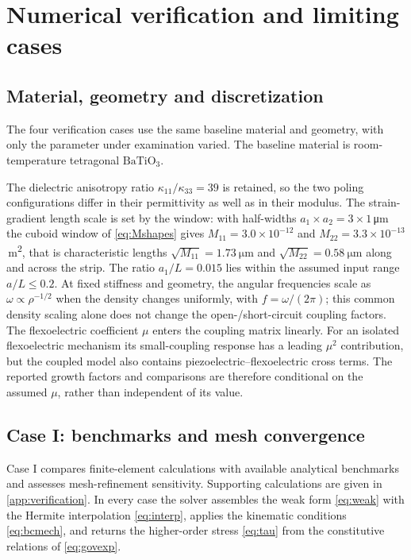 \FloatBarrier
\section{Numerical verification and limiting cases}
\label{sec:verification}

\FloatBarrier
\subsection{Material, geometry and discretization}
\label{sec:material}

The four verification cases use the same baseline material and geometry,
with only the parameter under examination varied. The baseline material is
room-temperature tetragonal $\mathrm{BaTiO_3}$.

The dielectric anisotropy ratio
$\kappa_{11}/\kappa_{33}=39$ is retained, so the two poling configurations
differ in their permittivity as well as in their modulus. The strain-gradient
length scale is set by the window: with half-widths
$a_1\times a_2=3\times1$\,\si{\micro\meter} the cuboid window of
\eqref{eq:Mshapes} gives $M_{11}=3.0\times10^{-12}$ and
$M_{22}=3.3\times10^{-13}$\,\si{\square\meter}, that is characteristic lengths
$\sqrt{M_{11}}=\SI{1.73}{\micro\meter}$ and
$\sqrt{M_{22}}=\SI{0.58}{\micro\meter}$ along and across the strip. The ratio
$a_1/L=0.015$ lies within the assumed input range $a/L\le0.2$.
At fixed stiffness and geometry, the angular frequencies scale as
$\omega\propto\rho^{-1/2}$ when the density changes uniformly, with
$f=\omega/(2\pi)$; this common density scaling alone does not change the
open-/short-circuit coupling factors. The flexoelectric coefficient $\mu$ enters the coupling matrix linearly.
For an isolated flexoelectric mechanism its small-coupling response has a
leading $\mu^2$ contribution, but the coupled model also contains
piezoelectric--flexoelectric cross terms. The reported growth factors and
comparisons are therefore conditional on the assumed $\mu$, rather than
independent of its value.

\FloatBarrier
\subsection{Case I: benchmarks and mesh convergence}

Case I compares finite-element calculations with available analytical
benchmarks and assesses mesh-refinement sensitivity. Supporting calculations
are given in \ref{app:verification}.
In every case the solver assembles the weak form \eqref{eq:weak} with the
Hermite interpolation \eqref{eq:interp}, applies the kinematic conditions
\eqref{eq:bcmech}, and returns the higher-order stress \eqref{eq:tau} from the
constitutive relations of \eqref{eq:govexp}.

